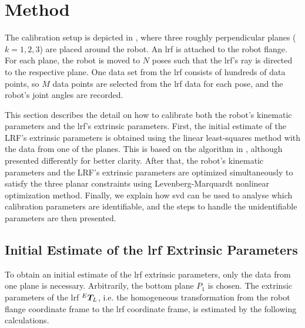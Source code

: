 \section{Method}
\label{sec:method}

The calibration setup is depicted in , where three roughly perpendicular planes ($k=1,2,3$) are placed around the robot. An \ac{lrf} is attached to the robot flange. For each plane, the robot is moved to $N$ poses such that the \ac{lrf}'s ray is directed to the respective plane. One data set from the \ac{lrf} consists of hundreds of data points, so $M$ data points are selected from the \ac{lrf} data for each pose, and the robot's joint angles are recorded. 

This section describes the detail on how to calibrate both the robot's kinematic parameters and the \ac{lrf}'s extrinsic parameters. First, the initial estimate of the LRF's extrinsic parameters is obtained using the linear least-squares method with the data from one of the planes. This is based on the algorithm in \cite{Zhang2004}, although presented differently for better clarity. After that, the robot's kinematic parameters and the LRF's extrinsic parameters are optimized simultaneously to satisfy the three planar constraints using Levenberg-Marquardt nonlinear optimization method. Finally, we explain how \ac{svd} can be used to analyse which calibration parameters are identifiable, and the steps to handle the unidentifiable parameters are then presented. 
\subsection{Initial Estimate of the \ac{lrf} Extrinsic Parameters}
\label{sec:first_step}
To obtain an initial estimate of the \ac{lrf} extrinsic parameters, only the data from one plane is necessary. Arbitrarily, the bottom plane $P_1$ is chosen. The extrinsic parameters of the \ac{lrf} ${^E}\vb*{T}_L$, i.e. the homogeneous transformation from the robot flange coordinate frame to the \ac{lrf} coordinate frame, is estimated by the following calculations.

